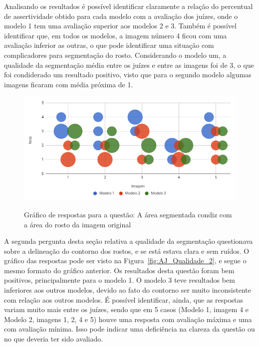 \documentclass[12pt,oneside,a4paper,english,french,spanish,brazil,]{abntex2}
\begin{document}
Analisando os resultados é possível identificar claramente a relação do percentual de assertividade obtido para cada modelo com a avaliação dos juízes, onde o modelo 1 tem uma avaliação superior aos modelos 2 e 3. Também é possível identificar que, em todos os modelos, a imagem número 4 ficou com uma avaliação inferior as outras, o que pode identificar uma situação com complicadores para segmentação do rosto. Considerando o modelo um, a qualidade da segmentação média entre os juízes e entre as imagens foi de 3, o que foi condiderado um resultado positivo, visto que para o segundo modelo algumas imagens ficaram com média próxima de 1.

\begin{figure}[ht]
\centering
\caption{Gráfico de respostas para a questão: A área segmentada condiz com a área do rosto da imagem original}
\includegraphics[width=1.0\textwidth]{imagens/Avaliacao_Juizes/Qualidade_1.PNG}
\sourceAuthor{}
\label{fig:AJ_Qualidade_1}
\end{figure}

A segunda pergunta desta seção relativa a qualidade da segmentação questionava sobre a delineação do contorno dos rostos, e se está estava clara e sem ruídos. O gráfico das respostas pode ser visto na Figura~\ref{fig:AJ_Qualidade_2}, e segue o mesmo formato do gráfico anterior. Os resultados desta questão foram bem positivos, principalmente para o modelo 1. O modelo 3 teve resultados bem inferiores aos outros modelos, devido ao fato do contorno ser muito inconsistente com relação aos outros modelos. É possível identificar, ainda, que as respostas variam muito mais entre os juízes, sendo que em 5 casos (Modelo 1, imagem 4 e Modelo 2, imagens 1, 2, 4 e 5) houve uma resposta com avaliação máxima e uma com avaliação mínima. Isso pode indicar uma deficiência na clareza da questão ou no que deveria ter sido avaliado.
\end{document}
